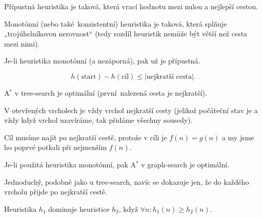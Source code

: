 \documentclass[12pt]{article}					%
\begin{document}
\begin{definice}
	Přípustná heuristika je taková, která vrací hodnotu mezi nulou a nejlepší cestou.

	Monotónní (nebo také konzistentní) heuristika je taková, která splňuje „trojúhelníkovou nerovnost“ (tedy rozdíl heuristik nemůže být větší než cesta mezi nimi).
\end{definice}

\begin{tvrzeni}
	Je-li heuristika monotónní (a nezáporná), pak už je přípustná.

	\begin{dukazin}
		$$ h(\text{start}) - h(\text{cíl}) ≤ |\text{nejkratší cesta}|. $$
	\end{dukazin}
\end{tvrzeni}

\begin{tvrzeni}
	A$^*$ v tree-search je optimální (první nalezená cesta je nejkratší).

	\begin{dukazin}
		V otevřených vrcholech je vždy vrchol nejkratší cesty (jelikož počáteční stav je a vždy když vrchol uzavíráme, tak přidáme všechny sousedy).

		Cíl musíme najít po nejkratší cestě, protože v cíli je $f(n) = g(n)$ a my jsme ho poprvé potkali při nejmenším $f(n)$.
	\end{dukazin}
\end{tvrzeni}

\begin{tvrzeni}
	Je-li použitá heuristika monotónní, pak A$^*$ v graph-search je optimální.

	\begin{dukazin}
		Jednoduchý, podobně jako u tree-search, navíc se dokazuje jen, že do každého vrcholu přijde po nejkratší cestě.
	\end{dukazin}
\end{tvrzeni}

\begin{definice}[Dominance]
	Heuristika $h_1$ dominuje heuristice $h_2$, když $\forall n: h_1(n) ≥ h_2(n)$.
\end{definice}
\end{document}
